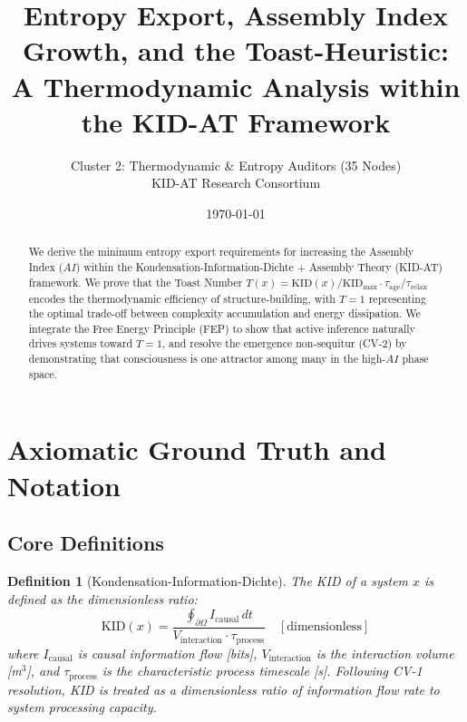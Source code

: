 \documentclass[11pt,a4paper]{article}
\title{\textbf{Entropy Export, Assembly Index Growth, and the Toast-Heuristic:}\\A Thermodynamic Analysis within the KID-AT Framework}
\author{Cluster 2: Thermodynamic \& Entropy Auditors (35 Nodes)\\KID-AT Research Consortium}
\date{\today}
\newtheorem{definition}[theorem]{Definition}
\begin{document}
\maketitle

\begin{abstract}
We derive the minimum entropy export requirements for increasing the Assembly Index ($AI$) within the Kondensation-Information-Dichte + Assembly Theory (KID-AT) framework. We prove that the Toast Number $T(x) = \text{KID}(x)/\text{KID}_{\max} \cdot \tau_{\text{age}}/\tau_{\text{relax}}$ encodes the thermodynamic efficiency of structure-building, with $T = 1$ representing the optimal trade-off between complexity accumulation and energy dissipation. We integrate the Free Energy Principle (FEP) to show that active inference naturally drives systems toward $T = 1$, and resolve the emergence non-sequitur (CV-2) by demonstrating that consciousness is one attractor among many in the high-$AI$ phase space.
\end{abstract}

\tableofcontents
\newpage

\section{Axiomatic Ground Truth and Notation}

\subsection{Core Definitions}

\begin{definition}[Kondensation-Information-Dichte]
The KID of a system $x$ is defined as the dimensionless ratio:
\begin{equation}
\boxed{\text{KID}(x) = \frac{\oint_{\partial\Omega} I_{\text{causal}}\, dt}{V_{\text{interaction}} \cdot \tau_{\text{process}}} \quad [\text{dimensionless}]}
\end{equation}
where $I_{\text{causal}}$ is causal information flow [bits], $V_{\text{interaction}}$ is the interaction volume [m$^3$], and $\tau_{\text{process}}$ is the characteristic process timescale [s]. Following CV-1 resolution, KID is treated as a \emph{dimensionless ratio} of information flow rate to system processing capacity.
\end{definition}
\end{document}
